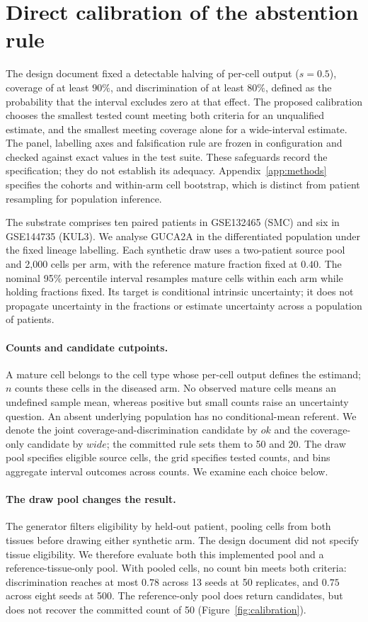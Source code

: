 \section{Direct calibration of the abstention rule}
\label{sec:calibration}

The design document fixed a detectable halving of per-cell output ($s=0.5$),
coverage of at least $90\%$, and discrimination of at least $80\%$, defined as
the probability that the interval excludes zero at that effect. The proposed
calibration chooses the smallest tested count meeting both criteria for an
unqualified estimate, and the smallest meeting coverage alone for a
wide-interval estimate. The panel, labelling axes and falsification rule are
frozen in configuration and checked against exact values in the test suite.
These safeguards record the specification; they do not establish its adequacy.
Appendix~\ref{app:methods} specifies the cohorts and within-arm cell bootstrap,
which is distinct from patient resampling for population inference.

The substrate comprises ten paired patients in GSE132465 (SMC) and six in
GSE144735 (KUL3). We analyse GUCA2A in the differentiated population under the
fixed lineage labelling. Each synthetic draw uses a two-patient source pool
and 2{,}000 cells per arm, with the reference mature fraction fixed at $0.40$.
The nominal 95\% percentile interval resamples mature cells within each arm
while holding fractions fixed. Its target is conditional intrinsic uncertainty;
it does not propagate uncertainty in the fractions or estimate uncertainty
across a population of patients.

\paragraph{Counts and candidate cutpoints.}
A mature cell belongs to the cell type whose per-cell output defines the
estimand; $n$ counts these cells in the diseased arm. No observed mature cells
means an undefined sample mean, whereas positive but small counts raise an
uncertainty question. An absent underlying population has no conditional-mean
referent. We denote the joint coverage-and-discrimination candidate by $ok$
and the coverage-only candidate by $wide$; the committed rule sets them to
50 and 20. The draw pool specifies eligible source cells, the grid specifies
tested counts, and bins aggregate interval outcomes across counts. We examine
each choice below.

\paragraph{The draw pool changes the result.}
The generator filters eligibility by held-out patient, pooling cells from both
tissues before drawing either synthetic arm. The design document did not
specify tissue eligibility. We therefore evaluate both this implemented pool
and a reference-tissue-only pool. With pooled cells, no count bin meets both
criteria: discrimination reaches at most $0.78$ across 13 seeds at 50
replicates, and $0.75$ across eight seeds at 500. The reference-only pool does
return candidates, but does not recover the committed count of 50
(Figure~\ref{fig:calibration}).

